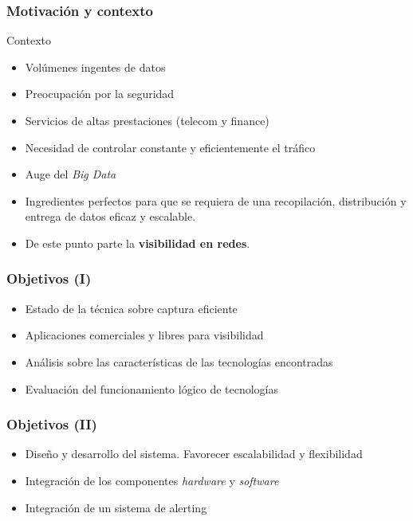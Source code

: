 \documentclass{beamer}
\begin{document}
\begin{frame}
\frametitle{Motivación y contexto}
\begin{block}{Contexto}
\begin{itemize}
	\item Volúmenes ingentes de datos
	\item Preocupación por la seguridad
	\item Servicios de altas prestaciones (telecom y finance)
	\item Necesidad de controlar constante y eficientemente el tráfico
	\item Auge del \textit{Big Data}
\end{itemize}
\end{block}

\begin{itemize}
	\item Ingredientes perfectos para que se requiera de una recopilación, distribución y entrega de datos eficaz y escalable.
	\item De este punto parte la \textbf{visibilidad en redes}.
\end{itemize}

\end{frame}

\begin{frame}
\frametitle{Objetivos (I)}

\begin{itemize}
	\item Estado de la técnica sobre captura eficiente
	\item Aplicaciones comerciales y libres para visibilidad
	\item Análisis sobre las características de las tecnologías encontradas
	\item Evaluación del funcionamiento lógico de tecnologías
\end{itemize}

\end{frame}

\begin{frame}
\frametitle{Objetivos (II)}
\begin{itemize}
	\item Diseño y desarrollo del sistema. Favorecer escalabilidad y flexibilidad
	\item Integración de los componentes \textit{hardware} y \textit{software}
	\item Integración de un sistema de alerting
\end{itemize}

\end{frame}
\end{document}
